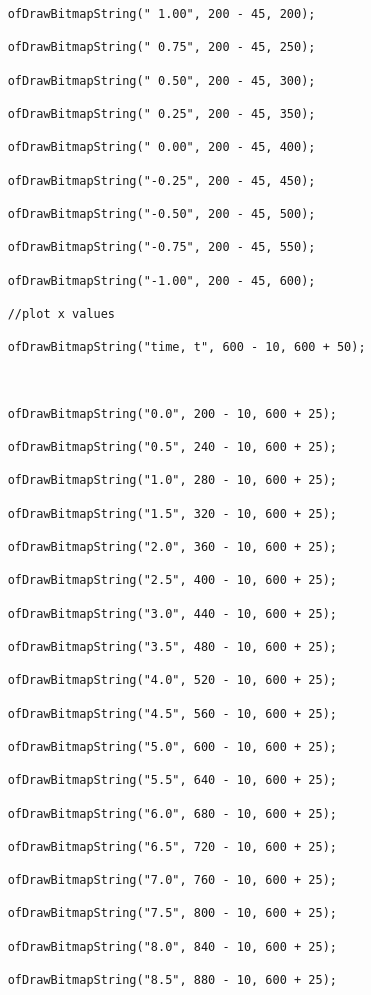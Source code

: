 \documentclass[letterpaper, 24pt, final, onecolumn, titlepage] {article}
\begin{document}
\begin{lstlisting}
    ofDrawBitmapString(" 1.00", 200 - 45, 200);

    ofDrawBitmapString(" 0.75", 200 - 45, 250);

    ofDrawBitmapString(" 0.50", 200 - 45, 300);

    ofDrawBitmapString(" 0.25", 200 - 45, 350);

    ofDrawBitmapString(" 0.00", 200 - 45, 400);

    ofDrawBitmapString("-0.25", 200 - 45, 450);

    ofDrawBitmapString("-0.50", 200 - 45, 500);

    ofDrawBitmapString("-0.75", 200 - 45, 550);

    ofDrawBitmapString("-1.00", 200 - 45, 600);

    //plot x values

    ofDrawBitmapString("time, t", 600 - 10, 600 + 50);



    ofDrawBitmapString("0.0", 200 - 10, 600 + 25);

    ofDrawBitmapString("0.5", 240 - 10, 600 + 25);

    ofDrawBitmapString("1.0", 280 - 10, 600 + 25);

    ofDrawBitmapString("1.5", 320 - 10, 600 + 25);

    ofDrawBitmapString("2.0", 360 - 10, 600 + 25);

    ofDrawBitmapString("2.5", 400 - 10, 600 + 25);

    ofDrawBitmapString("3.0", 440 - 10, 600 + 25);

    ofDrawBitmapString("3.5", 480 - 10, 600 + 25);

    ofDrawBitmapString("4.0", 520 - 10, 600 + 25);

    ofDrawBitmapString("4.5", 560 - 10, 600 + 25);

    ofDrawBitmapString("5.0", 600 - 10, 600 + 25);

    ofDrawBitmapString("5.5", 640 - 10, 600 + 25);

    ofDrawBitmapString("6.0", 680 - 10, 600 + 25);

    ofDrawBitmapString("6.5", 720 - 10, 600 + 25);

    ofDrawBitmapString("7.0", 760 - 10, 600 + 25);

    ofDrawBitmapString("7.5", 800 - 10, 600 + 25);

    ofDrawBitmapString("8.0", 840 - 10, 600 + 25);

    ofDrawBitmapString("8.5", 880 - 10, 600 + 25);


\end{lstlisting}
\end{document}

